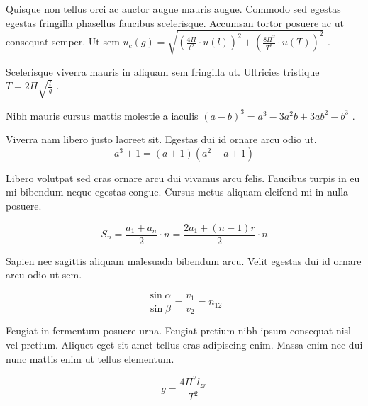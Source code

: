 \documentclass{article}
\begin{document}
Quisque non tellus orci ac auctor augue mauris augue. Commodo sed egestas egestas fringilla phasellus faucibus scelerisque. Accumsan tortor posuere ac ut consequat semper. Ut sem 
\begin{math}
	u_c(g)=\sqrt{(\frac{4\Pi}{t^2}\cdot u(l))^2+(\frac{8\Pi^2}{T^3}\cdot u(T))^2}
\end{math}
.\newline

Scelerisque viverra mauris in aliquam sem fringilla ut. Ultricies tristique 
$ T=2\Pi \sqrt{\frac{l}{g}} $
.\newline

Nibh mauris cursus mattis molestie a iaculis 
\( (a-b)^{3}=a^{3}-3a^{2}b+3ab^{2}-b^{3} \)
.\newline

Viverra nam libero justo laoreet sit. Egestas dui id ornare arcu odio ut.
\[ a^{3}+1=(a+1)(a^{2}-a+1) \]

Libero volutpat sed cras ornare arcu dui vivamus arcu felis. Faucibus turpis in eu mi bibendum neque egestas congue. Cursus metus aliquam eleifend mi in nulla posuere.

$$ S_{n}=\frac{a_{1}+a_{n}}{2}\cdot n=\frac{2a_{1}+(n-1)r}{2}\cdot n $$

Sapien nec sagittis aliquam malesuada bibendum arcu. Velit egestas dui id ornare arcu odio ut sem. 

\begin{displaymath}
	\frac{\sin \alpha}{\sin \beta}=\frac{v_1}{v_2}=n_{12}
\end{displaymath}

Feugiat in fermentum posuere urna. Feugiat pretium nibh ipsum consequat nisl vel pretium. Aliquet eget sit amet tellus cras adipiscing enim. Massa enim nec dui nunc mattis enim ut tellus elementum.

\begin{equation}
	g=\frac{4\Pi^2l_{zr}}{T^2}
\end{equation}
\end{document}
